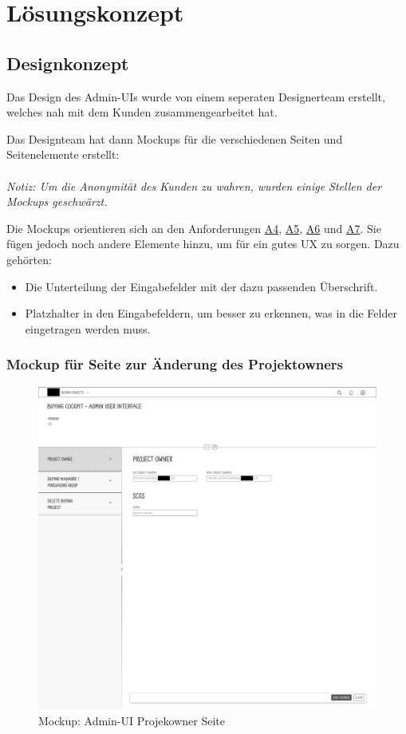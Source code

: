 \newpage
\section{Lösungskonzept}
\subsection[Designkonzept]{Designkonzept}
Das Design des Admin-UIs wurde von einem seperaten Designerteam erstellt, welches nah mit dem Kunden zusammengearbeitet hat.

Das Designteam hat dann Mockups für die verschiedenen Seiten und Seitenelemente erstellt: \\\\
\textit{Notiz: Um die Anonymität des Kunden zu wahren, wurden einige Stellen der Mockups geschwärzt.}

Die Mockups orientieren sich an den Anforderungen \hyperref[Tab:A4]{A4}, \hyperref[Tab:A5]{A5}, \hyperref[Tab:A6]{A6} und \hyperref[Tab:A7]{A7}. Sie fügen jedoch noch andere Elemente hinzu, um für ein gutes UX zu sorgen. Dazu gehörten: \\
\begin{itemize}
    \item Die Unterteilung der Eingabefelder mit der dazu passenden Überschrift.
    \item Platzhalter in den Eingabefeldern, um besser zu erkennen, was in die Felder eingetragen werden muss.
\end{itemize}
\subsubsection[Mockup für Seite zur Änderung des Projektowners]{Mockup für Seite zur Änderung des Projektowners}
\begin{figure}[H]
    \centering
    \includegraphics[width=\linewidth]{Images/Mockup_PO_anonym.png}
    \caption[Mockup: Admin-UI Projekowner Seite]{Mockup: Admin-UI Projekowner Seite}
\end{figure}

